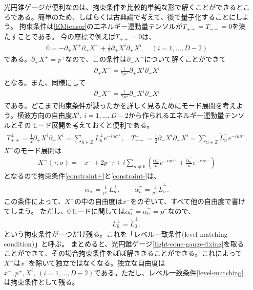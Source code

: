 \documentclass[report,paper=a4, fontsize=12pt, line_length=16cm, number_of_lines=33,dvipdfmx]{jlreq}
\numberwithin{equation}{chapter}
\numberwithin{equation}{section}
\newcommand{\Zb}{\mathbb{Z}}
\newcommand{\del}{\partial}
\newcommand{\alphat}{\tilde{\alpha}}
\newcommand{\Lp}{L^{\perp}}
\newcommand{\Ltp}{\widetilde{L}^{\perp}}
\begin{document}
光円錐ゲージが便利なのは、拘束条件を比較的単純な形で解くことができるところである。簡単のため、しばらくは古典論で考えて、後で量子化することにしよう。
拘束条件は\eqref{EMtensor}のエネルギー運動量テンソルが$T_{++}=T_{--}=0$を満たすことである。
今の座標で例えば$T_{++}=0$は、
\begin{align}
0=-\del_{+}X^{+}\del_{+}X^{-}+\frac12 \del_{+}X^{i}\del_{+}X^{i},\quad(i=1,\dots,D-2)
\end{align}
である。$\del_{+}X^{+}=p^{+}$なので、この条件は$\del_{+}X^{-}$について解くことができて
\begin{align}
\del_{+}X^{-}=\frac{1}{2p^{+}}\del_{+}X^{i}\del_{+}X^{i}
\label{constraint+}
\end{align}
となる。また、同様にして
\begin{align}
\del_{-}X^{-}=\frac{1}{2p^{+}}\del_{-}X^{i}\del_{-}X^{i}
\label{constraint-}
\end{align}
である。どこまで拘束条件が減ったかを詳しく見るためにモード展開を考えよう。横波方向の自由度$X^{i},\ i=1,\dots, D-2$から作られるエネルギー運動量テンソルとそのモード展開を考えておくと便利である。
\begin{align}
T^{\perp}_{++}=\frac{1}{2}\del_{+}X^{i}\del_{+}X^{i}=\sum_{n\in\Zb}\Lp_{n}e^{-in\sigma^{+}},\quad
T^{\perp}_{--}=\frac{1}{2}\del_{-}X^{i}\del_{-}X^{i}=\sum_{n\in\Zb}\Ltp_{n}e^{-in\sigma^{-}}.
\end{align}
$X^{-}$のモード展開は
\begin{align}
X^{-}(\tau,\sigma)=&x^{-}+2p^{-}\tau+i\sum_{n\ne 0} \left(
\frac{\alpha^{-}_{n}}{n}e^{-in\sigma^{+}}
+\frac{\alphat^{-}_{n}}{n}e^{-in\sigma^{-}}
\right)
\end{align}
となるので拘束条件\eqref{constraint+}と\eqref{constraint-}は、
\begin{align}
\alpha_n^{-}=\frac{1}{p^{+}} \Lp_{n},\qquad
\alphat_n^{-}=\frac{1}{p^{+}} \Ltp_{n}.\label{solution-constraint}
\end{align}
この条件によって、$X^{-}$の中の自由度は$x^{-}$をのぞいて、すべて他の自由度で書けてしまう。
ただし、0モードに関しては$\alpha_0^{-}=\alphat_0^{-}=p^{-}$なので、
\begin{align}
\Lp_{0}=\Ltp_{0},\label{level-matching}
\end{align}
という拘束条件が一つだけ残る。これを「レベル一致条件(level matching condition)」と呼ぶ。
まとめると、光円錐ゲージ\eqref{light-cone-gauge-fixing}を取ることができて、その場合拘束条件をぼぼ解ききることができる。これによって$X^{-}$は$x^{-}$を除いて独立ではなくなる。独立な自由度は
$x^{-},p^{+}, X^{i},\ (i=1,\dots,D-2)$である。ただし、レベル一致条件\eqref{level-matching}は拘束条件として残る。
\end{document}
